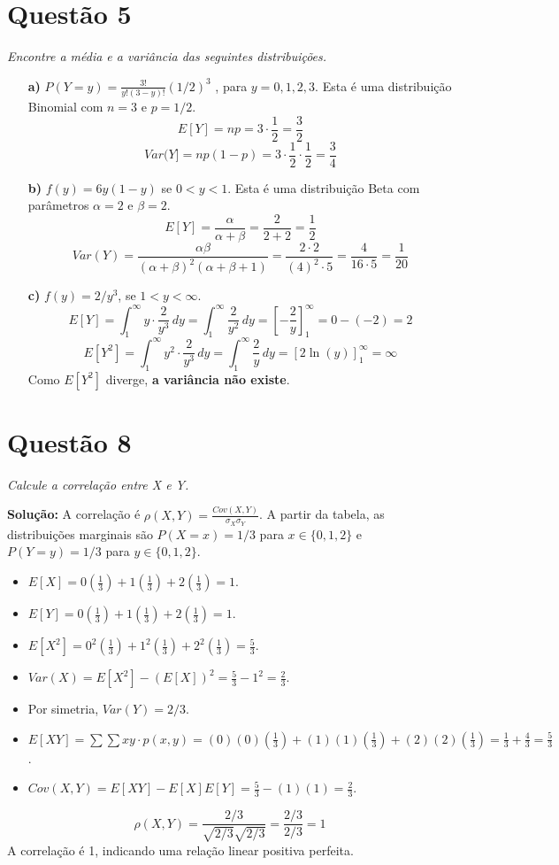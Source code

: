 \documentclass[12pt, a4paper]{article}
\begin{document}
\section*{Questão 5}
\textit{Encontre a média e a variância das seguintes distribuições.}

\begin{itemize}
    \item[\textbf{a)}] $P(Y=y)=\frac{3!}{y!(3-y)!}(1/2)^{3}$ , para $y=0,1,2,3$.
    Esta é uma distribuição Binomial com $n=3$ e $p=1/2$.
    $$ E[Y] = np = 3 \cdot \frac{1}{2} = \frac{3}{2} $$
    $$ Var(Y] = np(1-p) = 3 \cdot \frac{1}{2} \cdot \frac{1}{2} = \frac{3}{4} $$

    \item[\textbf{b)}] $f(y)=6y(1-y)$ se $0<y<1$.
    Esta é uma distribuição Beta com parâmetros $\alpha=2$ e $\beta=2$.
    $$ E[Y] = \frac{\alpha}{\alpha+\beta} = \frac{2}{2+2} = \frac{1}{2} $$
    $$ Var(Y) = \frac{\alpha\beta}{(\alpha+\beta)^2(\alpha+\beta+1)} = \frac{2 \cdot 2}{(4)^2 \cdot 5} = \frac{4}{16 \cdot 5} = \frac{1}{20} $$

    \item[\textbf{c)}] $f(y)=2/y^3$, se $1<y<\infty$.
    $$ E[Y] = \int_{1}^{\infty} y \cdot \frac{2}{y^3} \,dy = \int_{1}^{\infty} \frac{2}{y^2} \,dy = \left[-\frac{2}{y}\right]_{1}^{\infty} = 0 - (-2) = 2 $$
    $$ E[Y^2] = \int_{1}^{\infty} y^2 \cdot \frac{2}{y^3} \,dy = \int_{1}^{\infty} \frac{2}{y} \,dy = [2 \ln(y)]_{1}^{\infty} = \infty $$
    Como $E[Y^2]$ diverge, \textbf{a variância não existe}.
\end{itemize}

\newpage

\section*{Questão 8}
\textit{Calcule a correlação entre X e Y.}

\textbf{Solução:}
A correlação é $\rho(X,Y) = \frac{Cov(X,Y)}{\sigma_X \sigma_Y}$.
A partir da tabela, as distribuições marginais são $P(X=x)=1/3$ para $x \in \{0,1,2\}$ e $P(Y=y)=1/3$ para $y \in \{0,1,2\}$.
\begin{itemize}
    \item $E[X] = 0(\frac{1}{3}) + 1(\frac{1}{3}) + 2(\frac{1}{3}) = 1$.
    \item $E[Y] = 0(\frac{1}{3}) + 1(\frac{1}{3}) + 2(\frac{1}{3}) = 1$.
    \item $E[X^2] = 0^2(\frac{1}{3}) + 1^2(\frac{1}{3}) + 2^2(\frac{1}{3}) = \frac{5}{3}$.
    \item $Var(X) = E[X^2]-(E[X])^2 = \frac{5}{3} - 1^2 = \frac{2}{3}$.
    \item Por simetria, $Var(Y) = 2/3$.
    \item $E[XY] = \sum \sum xy \cdot p(x,y) = (0)(0)(\frac{1}{3}) + (1)(1)(\frac{1}{3}) + (2)(2)(\frac{1}{3}) = \frac{1}{3} + \frac{4}{3} = \frac{5}{3}$.
    \item $Cov(X,Y) = E[XY] - E[X]E[Y] = \frac{5}{3} - (1)(1) = \frac{2}{3}$.
\end{itemize}
$$ \rho(X,Y) = \frac{2/3}{\sqrt{2/3}\sqrt{2/3}} = \frac{2/3}{2/3} = 1 $$
A correlação é 1, indicando uma relação linear positiva perfeita.
\end{document}

